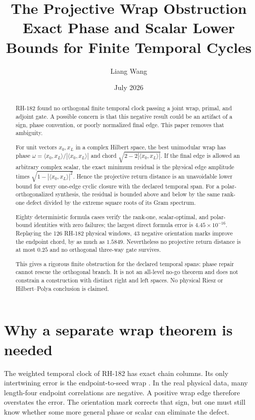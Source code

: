 \documentclass[12pt]{article}
\title{The Projective Wrap Obstruction\\
\large Exact Phase and Scalar Lower Bounds for Finite Temporal Cycles}
\author{Liang Wang}
\date{July 2026}
\theoremstyle{remark}
\begin{document}
\maketitle

\begin{abstract}
RH-182 found no orthogonal finite temporal clock passing a joint wrap,
primal, and adjoint gate.  A possible concern is that this negative result
could be an artifact of a sign, phase convention, or poorly normalized final
edge.  This paper removes that ambiguity.

For unit vectors $x_0,x_L$ in a complex Hilbert space, the best unimodular
wrap has phase
$\omega=\langle x_0,x_L\rangle/|\langle x_0,x_L\rangle|$ and chord
$\sqrt{2-2|\langle x_0,x_L\rangle|}$.  If the final edge is allowed an
arbitrary complex scalar, the exact minimum residual is the physical edge
amplitude times
$\sqrt{1-|\langle x_0,x_L\rangle|^2}$.  Hence the projective return distance
is an unavoidable lower bound for every one-edge cyclic closure with the
declared temporal span.  For a polar-orthogonalized synthesis, the residual
is bounded above and below by the same rank-one defect divided by the extreme
square roots of its Gram spectrum.

Eighty deterministic formula cases verify the rank-one, scalar-optimal, and
polar-bound identities with zero failures; the largest direct formula error
is $4.45\times10^{-16}$.  Replaying the 126 RH-182 physical windows, 43
negative orientation marks improve the endpoint chord, by as much as
$1.5849$.  Nevertheless no projective return distance is at most $0.25$ and
no orthogonal three-way gate survives.

This gives a rigorous finite obstruction for the declared temporal spans:
phase repair cannot rescue the orthogonal branch.  It is not an all-level
no-go theorem and does not constrain a construction with distinct right and
left spaces.  No physical Riesz or Hilbert--Polya conclusion is claimed.
\end{abstract}

\section{Why a separate wrap theorem is needed}

The weighted temporal clock of RH-182 has exact chain columns.  Its only
intertwining error is the endpoint-to-seed wrap \citep{WangRH182}.  In the
real physical data, many length-four endpoint correlations are negative.
A positive wrap edge therefore overstates the error.  The orientation mark
corrects that sign, but one must still know whether some more general phase
or scalar can eliminate the defect.
\end{document}
